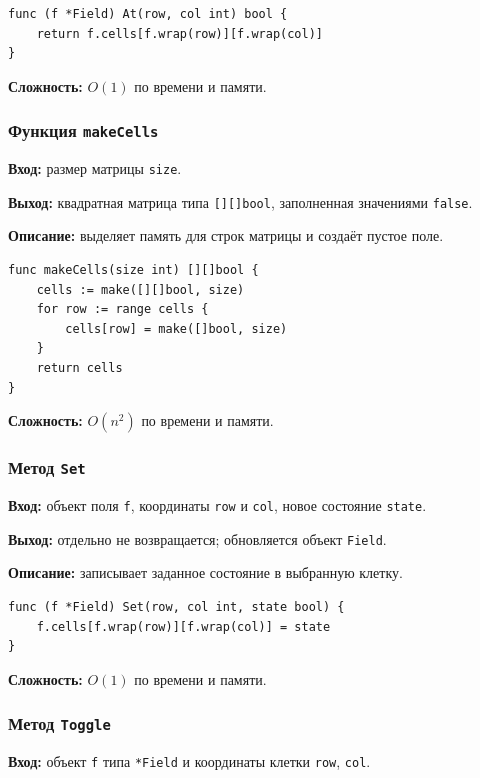 \begin{lstlisting}[style=gostyle,caption={Чтение состояния клетки}]
func (f *Field) At(row, col int) bool {
    return f.cells[f.wrap(row)][f.wrap(col)]
}
\end{lstlisting}

\textbf{Сложность:} $O(1)$ по времени и памяти.

\subsubsection{Функция \texttt{makeCells}}
\textbf{Вход:} размер матрицы \texttt{size}.

\textbf{Выход:} квадратная матрица типа \texttt{[][]bool}, заполненная
значениями \texttt{false}.

\textbf{Описание:} выделяет память для строк матрицы и создаёт пустое поле.

\begin{lstlisting}[style=gostyle,caption={Создание матрицы клеток}]
func makeCells(size int) [][]bool {
    cells := make([][]bool, size)
    for row := range cells {
        cells[row] = make([]bool, size)
    }
    return cells
}
\end{lstlisting}

\textbf{Сложность:} $O(n^2)$ по времени и памяти.

\subsubsection{Метод \texttt{Set}}
\textbf{Вход:} объект поля \texttt{f}, координаты \texttt{row} и
\texttt{col}, новое состояние \texttt{state}.

\textbf{Выход:} отдельно не возвращается; обновляется объект \texttt{Field}.

\textbf{Описание:} записывает заданное состояние в выбранную клетку.

\begin{lstlisting}[style=gostyle,caption={Задание состояния клетки}]
func (f *Field) Set(row, col int, state bool) {
    f.cells[f.wrap(row)][f.wrap(col)] = state
}
\end{lstlisting}

\textbf{Сложность:} $O(1)$ по времени и памяти.

\subsubsection{Метод \texttt{Toggle}}
\textbf{Вход:} объект \texttt{f} типа \texttt{*Field} и координаты
клетки \texttt{row}, \texttt{col}.

